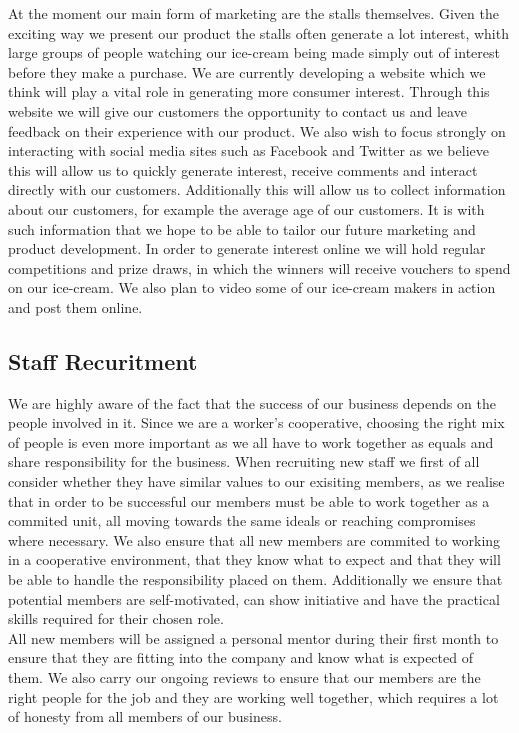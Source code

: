 \documentclass{article}
\begin{document}
  At the moment our main form of marketing are the stalls themselves. Given the exciting way we present our product the stalls often generate a lot interest, whith large groups of people watching our ice-cream being made simply out of interest before they make a purchase. We are currently developing a website which we think will play a vital role in generating more consumer interest. Through this website we will give our customers the opportunity to contact us and leave feedback on their experience with our product. We also wish to focus strongly on interacting with social media sites such as Facebook and Twitter as we believe this will allow us to quickly generate interest, receive comments and interact directly with our customers. Additionally this will allow us to collect information about our customers, for example the average age of our customers. It is with such information that we hope to be able to tailor our future marketing and product development. In order to generate interest online we will hold regular competitions and prize draws, in which the winners will receive vouchers to spend on our ice-cream. We also plan to video some of our ice-cream makers in action and post them online.

  \subsection{Staff Recuritment}

  We are highly aware of the fact that the success of our business depends on the people involved in it. Since we are a worker's cooperative, choosing the right mix of people is even more important as we all have to work together as equals and share responsibility for the business. When recruiting new staff we first of all consider whether they have similar values to our exisiting members, as we realise that in order to be successful our members must be able to work together as a commited unit, all moving towards the same ideals or reaching compromises where necessary. We also ensure that all new members are commited to working in a cooperative environment, that they know what to expect and that they will be able to handle the responsibility placed on them. Additionally we ensure that potential members are self-motivated, can show initiative and have the practical skills required for their chosen role. \\

  All new members will be assigned a personal mentor during their first month to ensure that they are fitting into the company and know what is expected of them. We also carry our ongoing reviews to ensure that our members are the right people for the job and they are working well together, which requires a lot of honesty from all members of our business. \\
\end{document}
